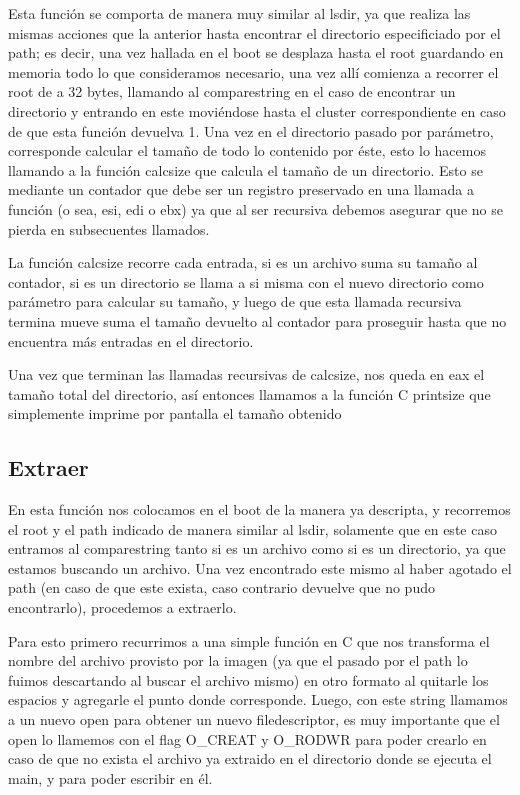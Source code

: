 \documentclass[a4paper,10pt]{article}
\begin{document}
Esta función se comporta de manera muy similar al lsdir, ya que realiza las mismas acciones que la anterior hasta encontrar el directorio especificiado por el path; es decir, una vez hallada en el boot se desplaza hasta el root guardando en memoria todo lo que consideramos necesario, una vez allí comienza a recorrer el root de a 32 bytes, llamando al comparestring en el caso de encontrar un directorio y entrando en este moviéndose hasta el cluster correspondiente en caso de que esta función devuelva 1. Una vez en el directorio pasado por parámetro, corresponde calcular el tamaño de todo lo contenido por éste, esto lo hacemos llamando a la función calcsize que calcula el tamaño de un directorio. Esto se mediante un contador que debe ser un registro preservado en una llamada a función (o sea, esi, edi o ebx) ya que al ser recursiva debemos asegurar que no se pierda en subsecuentes llamados.

La función calcsize recorre cada entrada, si es un archivo suma su tamaño al contador, si es un directorio se llama a si misma con el nuevo directorio como parámetro para calcular su tamaño, y luego de que esta llamada recursiva termina mueve suma el tamaño devuelto al contador para proseguir hasta que no encuentra más entradas en el directorio.

Una vez que terminan las llamadas recursivas de calcsize, nos queda en eax el tamaño total del directorio, así entonces llamamos a la función C printsize que simplemente imprime por pantalla el tamaño obtenido

\subsection{Extraer}

En esta función nos colocamos en el boot de la manera ya descripta, y recorremos el root y el path indicado de manera similar al lsdir, solamente que en este caso entramos al comparestring tanto si es un archivo como si es un directorio, ya que estamos buscando un archivo. Una vez encontrado este mismo al haber agotado el path (en caso de que este exista, caso contrario devuelve que no pudo encontrarlo), procedemos a extraerlo.

Para esto primero recurrimos a una simple función en C que nos transforma el nombre del archivo provisto por la imagen (ya que el pasado por el path lo fuimos descartando al buscar el archivo mismo) en otro formato al quitarle los espacios y agregarle el punto donde corresponde. Luego, con este string llamamos a un nuevo open para obtener un nuevo filedescriptor, es muy importante que el open lo llamemos con el flag O\_CREAT y O\_RODWR para poder crearlo en caso de que no exista el archivo ya extraido en el directorio donde se ejecuta el main, y para poder escribir en él. 
\end{document}
